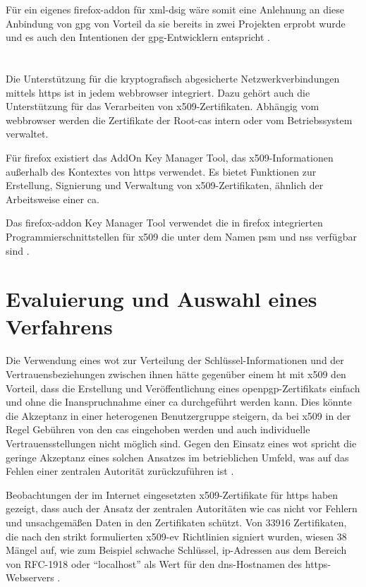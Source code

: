 Für ein eigenes \gls{firefox-addon} für \gls{xml-dsig} wäre somit eine Anlehnung an diese Anbindung von \gls{gpg} von Vorteil da sie bereits in zwei Projekten
erprobt wurde und es auch den Intentionen der \gls{gpg}-Entwicklern entspricht \cite{pgp}.

\section{\protect{}}
\label{sec:Signaturverfahren:x509}
Die Unterstützung für die kryptografisch abgesicherte Netzwerkverbindungen mittels \gls{https} ist in jedem \gls{webbrowser} integriert. Dazu gehört auch die
Unterstützung für das Verarbeiten von \gls{x509}-Zertifikaten. Abhängig vom \gls{webbrowser} werden die Zertifikate der Root-\glspl{ca} intern oder vom
Betriebssystem verwaltet.

Für \gls{firefox} existiert das AddOn Key Manager Tool, das \gls{x509}-Informationen außerhalb des Kontextes von \gls{https} verwendet. Es bietet Funktionen zur
Erstellung, Signierung und Verwaltung von \gls{x509}-Zertifikaten, ähnlich der Arbeitsweise einer \gls{ca}. 

Das \gls{firefox-addon} Key  Manager Tool verwendet die in \gls{firefox} integrierten Programmierschnittstellen für \gls{x509} die unter dem Namen \gls{psm}
und \gls{nss} verfügbar sind \cite{key-manager-tool}. 

\section{Evaluierung und Auswahl eines Verfahrens}
Die Verwendung eines \gls{wot} zur Verteilung der Schlüssel-Informationen und der Vertrauensbeziehungen zwischen ihnen hätte gegenüber einem \gls{ht} mit
\gls{x509} den Vorteil, dass die Erstellung und Veröffentlichung eines \gls{openpgp}-Zertifikats einfach und ohne die Inanspruchnahme einer \gls{ca}
durchgeführt werden kann. Dies könnte die Akzeptanz in einer heterogenen Benutzergruppe steigern, da bei \gls{x509} in der Regel Gebühren von den \glspl{ca}
eingehoben werden und auch individuelle Vertrauensstellungen nicht möglich sind. Gegen den Einsatz eines \gls{wot} spricht die geringe Akzeptanz eines solchen
Ansatzes im betrieblichen Umfeld, was auf das Fehlen einer zentralen Autorität zurückzuführen ist \cite{krypto-pki-internet}.

Beobachtungen der im Internet eingesetzten \gls{x509}-Zertifikate für \gls{https} haben gezeigt, dass auch der Ansatz der zentralen Autoritäten wie \glspl{ca}
nicht vor Fehlern und unsachgemäßen Daten in den Zertifikaten schützt. Von 33916 Zertifikaten, die nach den strikt formulierten \gls{x509-ev} Richtlinien
\cite{ev-ssl} signiert wurden, wiesen 38 Mängel auf, wie zum Beispiel schwache Schlüssel, \gls{ip}-Adressen aus dem Bereich von RFC-1918 oder "`localhost"' als
Wert für den \gls{dns}-Hostnamen des \gls{https}-Webservers \cite{ssliverse:27c3}.

